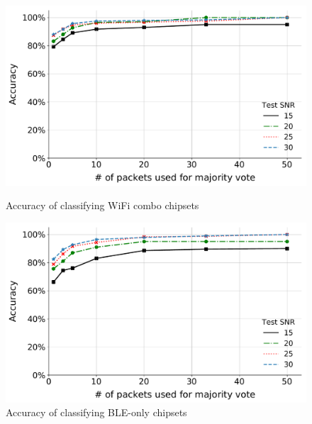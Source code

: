 \begin{figure}
\centering
%
\begin{minipage}{0.45\textwidth}
\includegraphics[width=\linewidth]{plots/accuracy_esp.pdf}
\caption{Accuracy of classifying WiFi combo chipsets}
\label{fig:11}
\end{minipage}
%
\hspace{0.04\textwidth}
%
\begin{minipage}{0.45\textwidth}
\centering
\includegraphics[width=\linewidth]{plots/accuracy_snr2.pdf}
\caption{Accuracy of classifying BLE-only chipsets}
\label{fig:13}
\end{minipage}
%
\end{figure}

